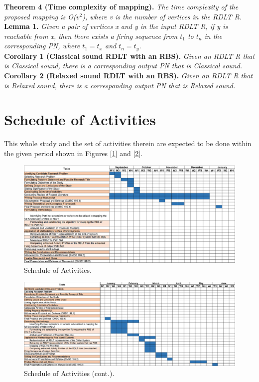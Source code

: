 \documentclass[12pt]{article}
\begin{document}
    \noindent \textbf{Theorem 4 (Time complexity of mapping).} \textit{The time complexity of the proposed mapping is O($v^2$), where v is the number of vertices in the RDLT R.} \\

    \textbf{Lemma 1.} \textit{Given a pair of vertices x and y in the input RDLT R, if y is reachable from x, then there exists a firing sequence from $t_{1}$ to $t_{n}$ in the corresponding PN, where $t_{1} = t_{x}$ and $t_{n} = t_{y}$.} \\

    \textbf{Corollary 1 (Classical sound RDLT with an RBS).} \textit{Given an RDLT R that is Classical sound, there is a corresponding output PN that is Classical sound.} \\

    \textbf{Corollary 2 (Relaxed sound RDLT with an RBS).} \textit{Given an RDLT R that is Relaxed sound, there is a corresponding output PN that is Relaxed sound.}

    \section{Schedule of Activities}
    This whole study and the set of activities therein are expected to be done within the given period shown in Figures [\ref{schedule}] and [\ref{schedule_cont}].

    \begin{figure}
        \centering
        \includegraphics[scale=0.55]{figures/Schedule of Activities_1_v2.png}
        \caption{Schedule of Activities.}
        \label{schedule}
    \end{figure}

    \begin{figure}
        \centering
        \includegraphics[scale=0.55]{figures/Schedule of Activities_2_v2.png}
        \caption{Schedule of Activities (cont.).}
        \label{schedule_cont}
    \end{figure}

    \pagebreak

    \printbibliography[heading=bibintoc, title={References}]
\end{document}
